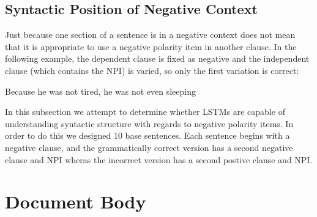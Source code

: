 \documentclass[11pt]{article}
\begin{document}
\subsection{Syntactic Position of Negative Context}
Just because one section of a sentence is in a negative context does not mean that it is appropriate to use a negative polarity item in another clause. In the following example, the dependent clause is fixed as negative and the independent clause (which contains the NPI) is varied, so only the first variation is correct:
\begin{exe}
[]
\begin{xlist}
\ex Because he was not tired, he was not even sleeping
\end{xlist}
\end{exe}
In this subsection we attempt to determine whether LSTMs are capable of understanding syntactic structure with regards to negative polarity items. In order to do this we designed 10 base sentences. Each sentence begins with a negative clause, and the grammatically correct version has a second negative clause and NPI wheras the incorrect version has a second postive clause and NPI.
\section{Document Body}
\end{document}
